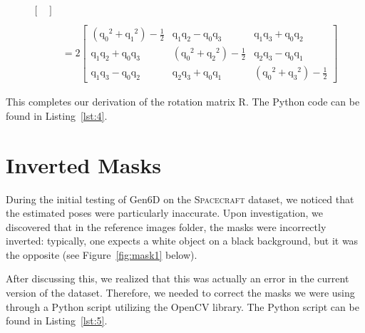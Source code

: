\begin{align*}
\begin{bmatrix}
		\end{bmatrix} \\\\
		&=2
		\begin{bmatrix}
    	({\mathrm{q}_0}^2+{\mathrm{q}_1}^2)-\frac{1}{2} & \mathrm{q}_1\mathrm{q}_2-\mathrm{q}_0\mathrm{q}_3 & \mathrm{q}_1\mathrm{q}_3+\mathrm{q}_0\mathrm{q}_2 \\
    	\mathrm{q}_1\mathrm{q}_2+\mathrm{q}_0\mathrm{q}_3 & ({\mathrm{q}_0}^2+{\mathrm{q}_2}^2)-\frac{1}{2} & \mathrm{q}_2\mathrm{q}_3-\mathrm{q}_0\mathrm{q}_1 \\
    	\mathrm{q}_1\mathrm{q}_3-\mathrm{q}_0\mathrm{q}_2 & \mathrm{q}_2\mathrm{q}_3+\mathrm{q}_0\mathrm{q}_1 & ({\mathrm{q}_0}^2+{\mathrm{q}_3}^2)-\frac{1}{2}
		\end{bmatrix}
\end{align*} 

\bigskip

\noindent This completes our derivation of the rotation matrix $\bm{\mathrm{R}}$. The Python code can be found in Listing~\ref{lst:4}.

\section{Inverted Masks}

During the initial testing of Gen6D on the \textsc{Spacecraft} dataset, we noticed that the estimated poses were particularly inaccurate. Upon investigation, we discovered that in the reference images folder, the masks were incorrectly inverted: typically, one expects a white object on a black background, but it was the opposite (see Figure~\ref{fig:mask1} below).

After discussing this, we realized that this was actually an error in the current version of the dataset. Therefore, we needed to correct the masks we were using through a Python script utilizing the OpenCV library. The Python script can be found in Listing~\ref{lst:5}.


\bigskip

